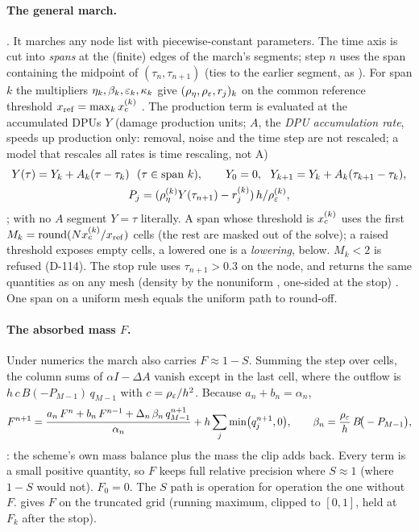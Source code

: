 \paragraph{The general march.} . It marches any node list with
piecewise-constant parameters. The time axis is cut into \emph{spans} at the (finite) edges of the march's
segments; step $n$ uses the span containing the midpoint of $(\tau_n,\tau_{n+1})$ (ties to the earlier segment,
as ). For span $k$ the multipliers $\eta_k,\beta_k,\varepsilon_k,\kappa_k$ give
$(\rho_\eta,\rho_\varepsilon,r_j)_k$ on the common reference threshold $x_{\rm ref}=\max_kx_c^{(k)}$
. The production term is evaluated at the accumulated DPUs $Y$ (damage production
units; $A$, the \emph{DPU accumulation rate}, speeds up production only: removal, noise and the time step are not rescaled; a model that rescales all rates is time rescaling,
not A)
\begin{equation}
  \begin{gathered}
  Y(\tau)=Y_k+A_k(\tau-\tau_k)\ \ (\tau\in\text{span }k),\qquad Y_0=0,\ \ Y_{k+1}=Y_k+A_k(\tau_{k+1}-\tau_k),\\
  P_j=(\rho_\eta^{(k)}Y(\tau_{n+1})-r_j^{(k)})\,h/\rho_\eps^{(k)},
  \end{gathered}
\end{equation}
; with no $A$ segment $Y=\tau$ literally. A span whose threshold is
$x_c^{(k)}$ uses the first $M_k=\mathrm{round}(Nx_c^{(k)}/x_{\rm ref})$ cells (the rest are masked out of the
solve); a raised threshold exposes empty cells, a lowered one is a \emph{lowering}, below. $M_k<2$ is refused
(D-114). The stop rule uses $\tau_{n+1}>0.3$ on the node, and  returns the same quantities as
 on any mesh (density by the nonuniform , one-sided at the stop)
. One span on a uniform mesh equals the uniform path to round-off.

\paragraph{The absorbed mass $F$.} Under numerics  the march also carries $F\approx1-S$. Summing the
step over cells, the column sums of $\alpha I-\Delta A$ vanish except in the last cell, where the outflow is
$h\,c\,B(-P_{M-1})\,q_{M-1}$ with $c=\rho_\varepsilon/h^2$. Because $a_n+b_n=\alpha_n$,
\begin{equation}
  F^{n+1}=\frac{a_n\,F^n+b_n\,F^{n-1}+\Delta_n\,\beta_n\,q^{n+1}_{M-1}}{\alpha_n}+h\sum_j\min\!\big(q^{n+1}_j,0\big),\qquad
  \beta_n=\frac{\rho_\varepsilon}{h}\,B\!\big(-P_{M-1}\big),
  \label{eq:fp-F}
\end{equation}
: the scheme's own mass balance plus the
mass the clip adds back. Every term is a small positive quantity, so $F$ keeps full relative precision where
$S\approx1$ (where $1-S$ would not). $F_0=0$. The $S$ path is operation for operation the one without $F$.
 gives $F$ on the truncated grid (running maximum, clipped to $[0,1]$, held at $F_k$ after
the stop).

